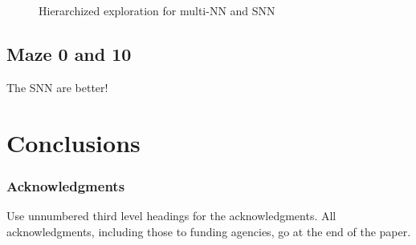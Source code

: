 \documentclass{article} %
\begin{document}
\begin{figure}[h!]
	\centering
	\caption{Hierarchized exploration for multi-NN and SNN}
	\label{fig:hierarchized-exploration}
\end{figure}

\subsection{Maze 0 and 10}
The SNN are better!


\section{Conclusions}

\subsubsection*{Acknowledgments}

Use unnumbered third level headings for the acknowledgments. All
acknowledgments, including those to funding agencies, go at the end of the paper.



\end{document}
